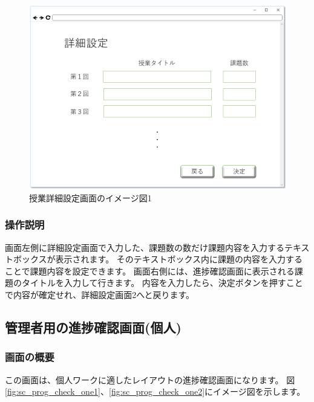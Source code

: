 \begin{figure}[htbp]
\begin{center}
  \includegraphics[width=1\linewidth,clip]{./img/sc_class_detail1.png}
  \caption{授業詳細設定画面のイメージ図1}\label{fig:sc_class_detail1}
\end{center}
\end{figure}

\subsubsection{操作説明}
画面左側に詳細設定画面で入力した、課題数の数だけ課題内容を入力するテキストボックスが表示されます。
そのテキストボックス内に課題の内容を入力することで課題内容を設定できます。
画面右側には、進捗確認画面に表示される課題のタイトルを入力して行きます。
内容を入力したら、決定ボタンを押すことで内容が確定せれ、詳細設定画面2へと戻ります。

\subsection{管理者用の進捗確認画面(個人)}
\subsubsection{画面の概要}
この画面は、個人ワークに適したレイアウトの進捗確認画面になります。
図\ref{fig:sc_prog_check_one1}、\ref{fig:sc_prog_check_one2}にイメージ図を示します。

